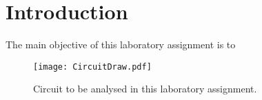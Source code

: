 \section{Introduction} \label{sec:introduction}

The main objective of this laboratory assignment is to 

\begin{figure}[H] \centering
  \texttt{[image: CircuitDraw.pdf]}
  \caption{Circuit to be analysed in this laboratory assignment.}
  \label{fig:CircuitDraw}
\end{figure}

